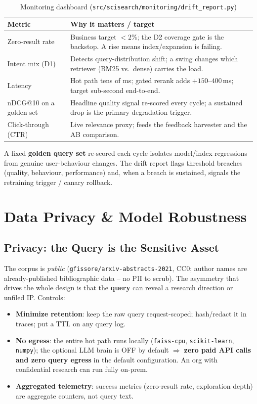 \documentclass[12pt,a4paper]{article}
\begin{document}
\begin{table}[H]
\centering
\caption{Monitoring dashboard (\texttt{src/scisearch/monitoring/drift\_report.py})}
\small
\begin{tabularx}{\linewidth}{@{} l L @{}}
\toprule
\textbf{Metric} & \textbf{Why it matters / target} \\
\midrule
Zero-result rate & Business target $<2\%$; the D2 coverage gate is the backstop. A rise means index/expansion is failing. \\
Intent mix (D1) & Detects query-distribution shift; a swing changes which retriever (BM25 vs.\ dense) carries the load. \\
Latency & Hot path tens of ms; gated rerank adds $+150$--$400$\,ms; target sub-second end-to-end. \\
nDCG@10 on a golden set & Headline quality signal re-scored every cycle; a sustained drop is the primary degradation trigger. \\
Click-through (CTR) & Live relevance proxy; feeds the feedback harvester and the AB comparison. \\
\bottomrule
\end{tabularx}
\end{table}

A fixed \textbf{golden query set} re-scored each cycle isolates model/index regressions from genuine user-behaviour changes. The drift report flags threshold breaches (quality, behaviour, performance) and, when a breach is sustained, signals the retraining trigger / canary rollback.

\section{Data Privacy \& Model Robustness}

\subsection{Privacy: the Query is the Sensitive Asset}

The corpus is \emph{public} (\texttt{gfissore/arxiv-abstracts-2021}, CC0; author names are already-published bibliographic data -- no PII to scrub). The asymmetry that drives the whole design is that the \textbf{query} can reveal a research direction or unfiled IP. Controls:
\begin{itemize}\setlength\itemsep{0.15em}
  \item \textbf{Minimize retention}: keep the raw query request-scoped; hash/redact it in traces; put a TTL on any query log.
  \item \textbf{No egress}: the entire hot path runs locally (\texttt{faiss-cpu}, \texttt{scikit-learn}, \texttt{numpy}); the optional LLM brain is OFF by default $\Rightarrow$ \textbf{zero paid API calls and zero query egress} in the default configuration. An org with confidential research can run fully on-prem.
  \item \textbf{Aggregated telemetry}: success metrics (zero-result rate, exploration depth) are aggregate counters, not query text.
\end{itemize}
\end{document}
